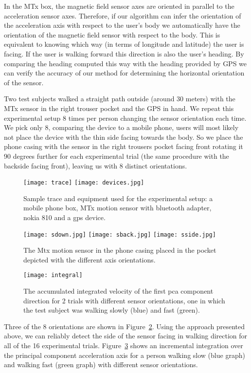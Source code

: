 In the MTx box, the magnetic field sensor axes are
oriented in parallel to the acceleration sensor axes. Therefore,
if our algorithm can infer the orientation of the acceleration axis
with respect to the user's body we automatically have the orientation
of the magnetic field sensor with respect to the body. This is
equivalent to knowing which way (in terms of longitude and latitude)
the user is facing. If the user is walking forward this direction is
also the user's heading. By comparing the heading computed this way
with the heading provided by GPS we can verify the accuracy of our
method for determining the horizontal orientation of the sensor.

Two test subjects walked a straight path outside (around 30 meters)
with the MTx sensor in the right trouser pocket and the GPS in hand.
We repeat this experimental setup 8 times per person changing the
sensor orientation each time. We pick only 8, comparing the device
to a mobile phone, users will most likely not place the device with
the thin side facing towards the body. So we place the phone casing
with the sensor in the right trousers pocket facing front rotating it
90 degrees further for each experimental trial (the same procedure with
the backside facing front), leaving us with 8 distinct orientations.

\begin{figure}[!t]
\centering \texttt{[image: trace]}
\texttt{[image: devices.jpg]}
	
\caption[Experimental setup]{Sample trace and equipment used for the experimental setup: a
 mobile phone box, MTx motion sensor with bluetooth adapter, nokia
 810 and a gps device.}
\label{devices}
\end{figure}

\begin{figure}[t]
\centering  
\texttt{[image: sdown.jpg]}
\texttt{[image: sback.jpg]}
\texttt{[image: sside.jpg]}
\caption[Device orientations]{The Mtx motion sensor in the phone casing placed in the pocket 
depicted with the different axis orientations.}
\label{fig:devices}
\end{figure}

\begin{figure}[!t]
\centering
\texttt{[image: integral]}

\caption[Integrated velocity]{The accumulated integrated velocity of the first pca component direction
for 2 trials with different sensor orientations, one in which the test subject 
was walking slowly (blue) and fast (green).}
\label{fig_integral}
\end{figure}
Three of the 8 orientations are shown in Figure~\ref{fig:devices}.
Using the approach presented above, we can reliably detect the side of the sensor
facing in walking direction for all of the 16 experimental trials. Figure~\ref{fig_integral}
shows an incremental integration over the principal component acceleration axis for a person
walking slow (blue graph) and walking fast (green graph) with different sensor orientations.

